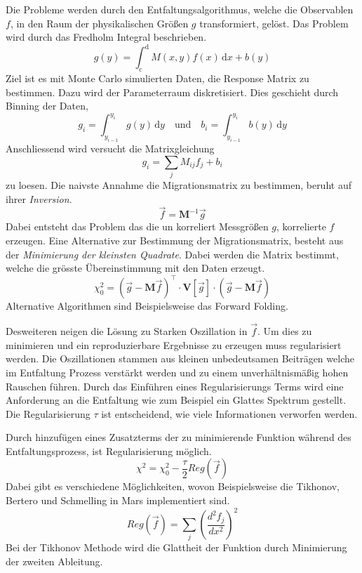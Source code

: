 Die Probleme werden durch den Entfaltungsalgorithmus,
welche die Observablen $f$,
in den Raum der physikalischen Größen $g$ transformiert,
gelöst.
Das Problem wird durch das Fredholm Integral beschrieben.
\begin{equation}
	g(y) = \int_\text{c}^\text{d} M(x,y) f(x) \, \text{d}x + b(y)
\end{equation}
Ziel ist es mit Monte Carlo simulierten Daten,
die Response Matrix zu bestimmen.
Dazu wird der Parameterraum diskretisiert.
Dies geschieht durch Binning der Daten,
\begin{equation}
	g_i = \int_{y_{i-1}}^{y_i} g(y) \, \text{d}y \quad \text{und} \quad
	b_i = \int_{y_{i-1}}^{y_i} b(y) \, \text{d}y
\end{equation}
Anschliessend wird versucht die Matrixgleichung 
\begin{equation}
	g_i = \sum_j M_{ij} f_j + b_i
\end{equation}
zu loesen.
Die naivste Annahme die Migrationsmatrix zu bestimmen,
beruht auf ihrer \textit{Inversion}.
\begin{equation}
    \vec{f} = \mathbf{M}^{-1} \vec{g}
\end{equation}
Dabei entsteht das Problem das die un korreliert Messgrößen $g$,
korrelierte $f$ erzeugen.
Eine Alternative zur Bestimmung der Migrationsmatrix,
besteht aus der \textit{Minimierung der kleinsten Quadrate}. 
Dabei werden die Matrix bestimmt,
welche die grösste Übereinstimmung mit den Daten erzeugt.
\begin{equation}
    \chi^2_0 = ( \vec{g} - \mathbf{M} \vec{f} )^\intercal
        \cdot \mathbf{V} \left[ \vec{g} \right] \cdot
        ( \vec{g} - \mathbf{M} \vec{f} )
\end{equation}
Alternative Algorithmen sind Beispielsweise das Forward Folding.

Desweiteren neigen die Lösung zu Starken Oszillation in $\vec{f}$.
Um dies zu minimieren und ein reproduzierbare Ergebnisse zu erzeugen
muss regularisiert werden.
Die Oszillationen stammen aus kleinen unbedeutsamen Beiträgen welche im
Entfaltung Prozess verstärkt werden und zu einem unverhältnismäßig hohen
Rauschen führen.
Durch das Einführen eines Regularisierungs Terms wird eine Anforderung an die 
Entfaltung wie zum Beispiel ein Glattes Spektrum gestellt.
Die Regularisierung $\tau$ ist entscheidend, wie viele
Informationen verworfen werden.

Durch hinzufügen eines Zusatzterms der zu minimierende Funktion während des
Entfaltungsprozess, ist Regularisierung möglich. 
\begin{equation}
    \chi^2 = \chi^2_0 - \frac{\tau}{2} Reg(\vec{f})
\end{equation}
Dabei gibt es verschiedene Möglichkeiten, 
wovon Beispielsweise die Tikhonov, Bertero  
und Schmelling in Mars implementiert sind.
\begin{equation}
    Reg(\vec{f}) = \sum_j \left( \frac{d^2 f_j}{dx^2} \right)^2
\end{equation}
Bei der Tikhonov Methode wird die Glattheit der 
Funktion durch Minimierung der zweiten Ableitung.

